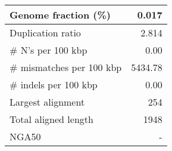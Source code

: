 \documentclass[12pt,a4paper]{article}
\begin{document}
\begin{table}[ht]
\begin{center}
\begin{tabular}{|l*{1}{|r}|}
Genome fraction (\%) & 0.017 \\ \hline
Duplication ratio & 2.814 \\ \hline
\# N's per 100 kbp & 0.00 \\ \hline
\# mismatches per 100 kbp & 5434.78 \\ \hline
\# indels per 100 kbp & 0.00 \\ \hline
Largest alignment & 254 \\ \hline
Total aligned length & 1948 \\ \hline
NGA50 & - \\ \hline
\end{tabular}
\end{center}
\end{table}
\end{document}
